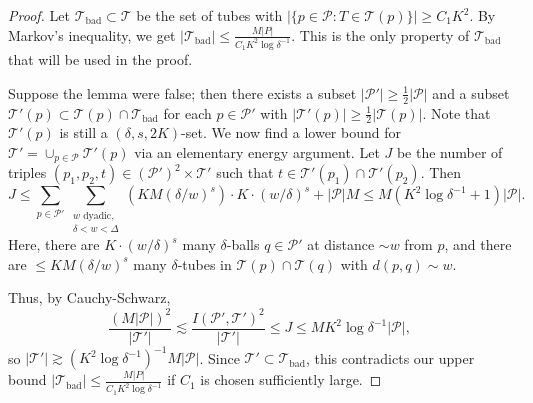 \documentclass{amsart}
\newtheorem{lemma}[prop]{Lemma}
\newtheorem{remark}[prop]{Remark}
\newcommand{\T}{\mathcal{T}}
\newcommand{\eps}{\varepsilon}
\newcommand{\leapp}{\lessapprox}
\newcommand{\lesim}{\lesssim}
\newcommand{\gesim}{\gtrsim}
\newcommand{\cD}{\mathcal{D}}
\newcommand{\cT}{\mathcal{T}}
\newcommand{\cP}{\mathcal{P}}
\newcommand{\Tbad}{\T_{\mathrm{bad}}}
\begin{document}

\begin{proof}
    Let $\Tbad \subset \T$ be the set of tubes with $|\{ p \in \cP : T \in \T(p) \}| \ge C_1 K^2$. By Markov's inequality, we get $|\Tbad| \le \frac{M|P|}{C_1 K^2 \log \delta^{-1}}$. This is the only property of $\Tbad$ that will be used in the proof.

    Suppose the lemma were false; then there exists a subset $|\cP'| \ge \frac{1}{2} |\cP|$ and a subset $\T'(p) \subset \T(p) \cap \Tbad$ for each $p \in \cP'$ with $|\T'(p)| \ge \frac{1}{2} |\T(p)|$. Note that $\T'(p)$ is still a $(\delta, s, 2K)$-set. We now find a lower bound for $\T' = \cup_{p \in \cP} \T'(p)$ via an elementary energy argument. Let $J$ be the number of triples $(p_1, p_2, t) \in (\cP')^2 \times \cT'$ such that $t \in \T'(p_1) \cap \T'(p_2)$. Then
    \begin{equation*}
        J \le \sum_{p \in \cP'} \sum_{\substack{w \text{ dyadic},\\\delta < w < \Delta}} (KM(\delta/w)^s) \cdot K \cdot (w/\delta)^s + |\cP| M \le M(K^2 \log \delta^{-1} + 1) |\cP|.
    \end{equation*}
    Here, there are $K \cdot (w/\delta)^s$ many $\delta$-balls $q \in \cP'$ at distance $\sim w$ from $p$, and there are $\le KM(\delta/w)^s$ many $\delta$-tubes in $\cT(p)\cap \cT(q)$ with $d(p, q) \sim w$.
    
    Thus, by Cauchy-Schwarz, \[\frac{(M |\cP|)^2}{|\T'|} \lesim \frac{I(\cP', \T')^2}{|\T'|} \le J \le MK^2 \log \delta^{-1} |\cP|,\]
    so $|\T'| \gesim (K^2 \log \delta^{-1})^{-1} M |\cP|$. Since $\T' \subset \Tbad$, this contradicts our upper bound $|\Tbad| \le \frac{M|P|}{C_1 K^2 \log \delta^{-1}}$ if $C_1$ is chosen sufficiently large.
\end{proof}

    
\end{document}
